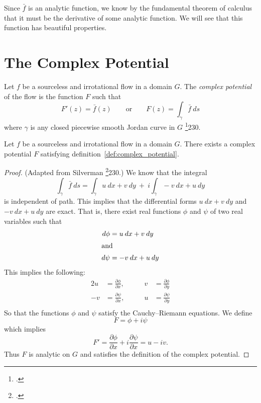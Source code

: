 \documentclass[letterpaper, twoside, 12 pt]{article}
\begin{document}
	Since $\bar f$ is an analytic function, we know by the fundamental theorem of calculus that it must be the derivative of some analytic function.
	We will see that this function has beautiful properties.

\section{The Complex Potential} %
	\label{sec:complex_potential}

	\begin{definition}
	\label{def:complex_potential}
		Let $f$ be a sourceless and irrotational flow in a domain $G$.
		The \textit{complex potential} of the flow is the function $F$ such that
		\[
			F'(z) = \bar f(z) \qquad \text{or} \qquad F(z) = \int_\gamma  \bar f \ ds
		\]
		where $\gamma$ is any closed piecewise smooth Jordan curve in $G$ \footcite{silverman}{230}.
	\end{definition}

	\begin{theorem}
		Let $f$ be a sourceless and irrotational flow in a domain $G$. 
		There exists a complex potential $F$ satisfying definition~\ref{def:complex_potential}.
	\end{theorem}
	\begin{proof}
		(Adapted from Silverman \footcite{silverman}{230}.)
		We know that the integral
		\[
			\int_\gamma \bar f \ ds = \int_\gamma u\> dx + v\> dy \ + \ i \! \int_\gamma -v \> dx + u \> dy
		\]
		is independent of path.
		This implies that the differential forms $u\> dx + v\> dy$ and $-v\> dx + u\> dy$ are exact.
		That is, there exist real functions $\phi$ and $\psi$ of two real variables such that 
		\begin{align*}
			d \phi &= u\> dx + v\> dy \\
			\intertext{and}
			d \psi &= -v\> dx + u\> dy
		\end{align*}
		This implies the following:
		\begin{alignat*}{2}
			u &= \frac{\partial \phi}{\partial x},  \qquad	& v &= \frac{\partial \phi}{\partial y} \\[1 em]
			-v &= \frac{\partial \psi}{\partial x}, \qquad	& u &= \frac{\partial \psi}{\partial y} \\
		\end{alignat*}
		So that the functions $\phi$ and $\psi$ satisfy the Cauchy--Riemann equations.
		We define 
		\[
			F = \phi + i \psi
		\]
		which implies
		\[
			F' = \frac{\partial \phi}{\partial x} + i \frac{\partial \psi}{\partial x} = u - iv.
		\]
		Thus $F$ is analytic on $G$ and satisfies the definition of the complex potential.
	\end{proof}
\end{document}
